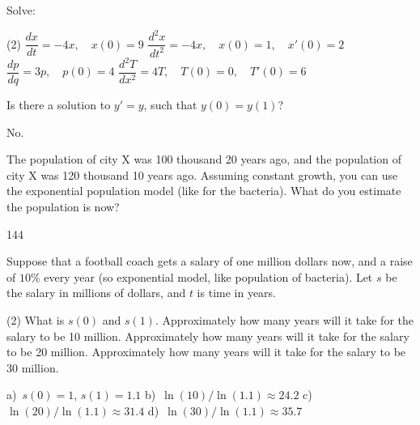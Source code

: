 \begin{exercise}\ansMark%
Solve:
\begin{tasks}(2)
\task $\dfrac{dx}{dt} = -4x, \quad x(0)=9$
\task $\dfrac{d^2x}{dt^2} = -4x, \quad x(0)=1, \quad x'(0)=2$
\task $\dfrac{dp}{dq} = 3 p, \quad p(0)=4$
\task $\dfrac{d^2T}{dx^2} = 4 T, \quad T(0)=0, \quad T'(0)=6$
\end{tasks}
\end{exercise}

\begin{exercise}
Is there a solution to $y' = y$, such that $y(0) = y(1)$?
\end{exercise}
\comboSol{%
}
{%
No.
}

\begin{exercise}
The population of city X was 100 thousand 20 years ago, and 
the population of city X was 120 thousand 10 years ago.  Assuming constant
growth, you can use the exponential population model
(like for the bacteria).  What do you estimate the population is now?
\end{exercise}
\comboSol{%
}
{%
144
}

\begin{exercise}
Suppose that a football coach gets a salary of
one million dollars now, and a raise of $10\%$ every year
(so exponential model, like population of bacteria).
Let $s$ be the salary in millions of dollars, and $t$ is time in years.
\begin{tasks}(2)
\task
What is $s(0)$ and $s(1)$.
\task
Approximately how many years will it take for the salary to be 10 million.
\task
Approximately how many years will it take for the salary to be 20 million.
\task
Approximately how many years will it take for the salary to be 30 million.
\end{tasks}
\end{exercise}
\comboSol{%
}
{%
a)~$s(0) = 1$, $s(1) = 1.1$\quad
b)~$\ln(10)/\ln(1.1) \approx 24.2$
c)~$\ln(20)/\ln(1.1) \approx 31.4$
d)~$\ln(30)/\ln(1.1) \approx 35.7$
}

\setcounter{exercise}{100}


